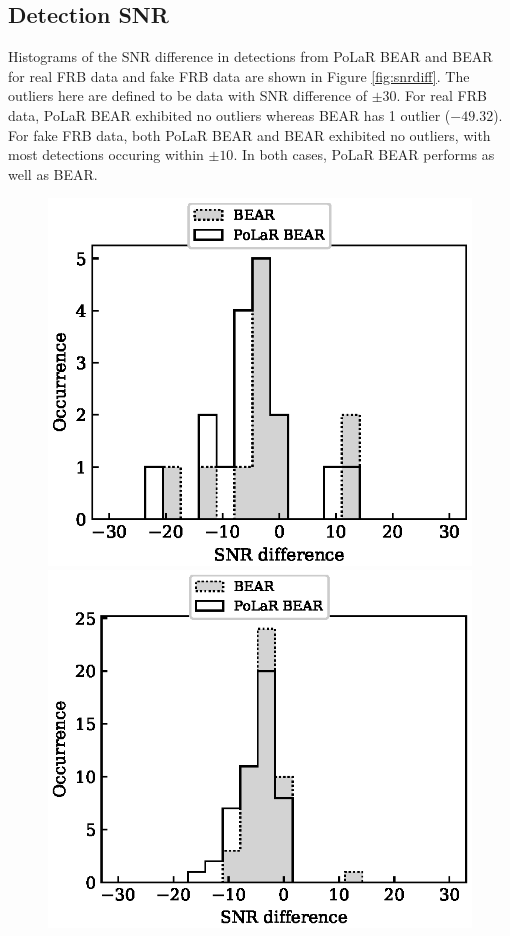 \subsection{Detection SNR}

Histograms of the SNR difference in detections from PoLaR BEAR and BEAR for real FRB data and fake FRB data are shown in Figure \ref{fig:snrdiff}. The outliers here are defined to be data with SNR difference of $\pm 30$. For real FRB data, PoLaR BEAR exhibited no outliers whereas BEAR has 1 outlier ($-49.32$). For fake FRB data, both PoLaR BEAR and BEAR exhibited no outliers, with most detections occuring within $\pm 10$. In both cases, PoLaR BEAR performs as well as BEAR. 

\begin{figure}
    \centering
    \begin{minipage}{0.5\textwidth}
        \includegraphics[width=\textwidth]{Graphs/frbsnrdiff.eps}
    \end{minipage}%
    \begin{minipage}{0.5\textwidth}
        \includegraphics[width=\textwidth]{Graphs/fakesnrdiff.eps}

\end{minipage}
\end{figure}
